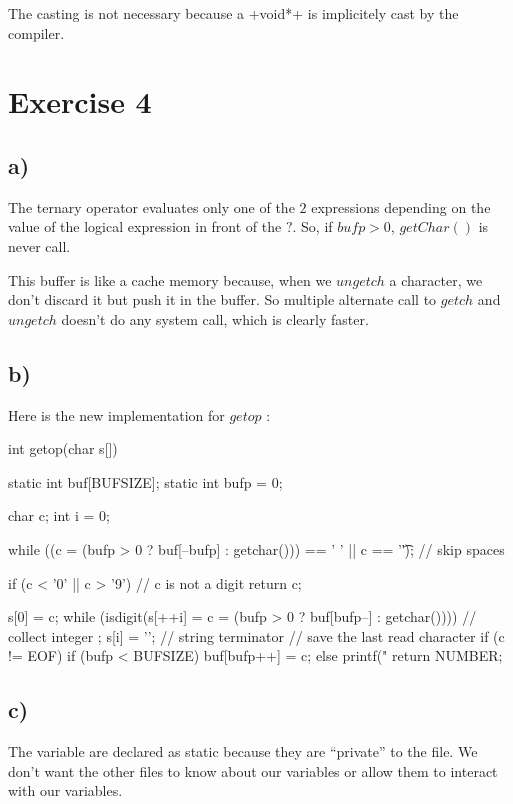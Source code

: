 \documentclass[a4paper,11pt]{report}
\begin{document}
The casting is not necessary because a \cinline+void*+ is implicitely cast by
the compiler.

\section*{Exercise 4}

\subsection*{a)}

The ternary operator evaluates only one of the $2$ expressions depending on the
value of the logical expression in front of the $?$. So, if $bufp > 0$,
$getChar()$ is never call.

This buffer is like a cache memory because, when we $ungetch$ a character, we
don't discard it but push it in the buffer. So multiple alternate call to
$getch$ and $ungetch$ doesn't do any system call, which is clearly faster.

\subsection*{b)}

Here is the new implementation for $getop$ :

\begin{ccode}
int getop(char s[])
{
    static int buf[BUFSIZE];
    static int bufp = 0;

    char c;
    int i = 0;

    while ((c = (bufp > 0 ? buf[--bufp] : getchar())) == ' ' || c == '\t'); // skip spaces

    if (c < '0' || c > '9')                    // c is not a digit
        return c;

    s[0] = c;
    while (isdigit(s[++i] = c = (bufp > 0 ? buf[bufp--] : getchar())))    // collect integer
        ;
    s[i] = '\0';                               // string terminator
    // save the last read character
    if (c != EOF)
        if (bufp < BUFSIZE)
            buf[bufp++] = c;
        else
            printf("%
    return NUMBER;
}
\end{ccode}

\subsection*{c)}

The variable are declared as static because they are ``private'' to the file. We
don't want the other files to know about our variables or allow them to interact
with our variables.
\end{document}
